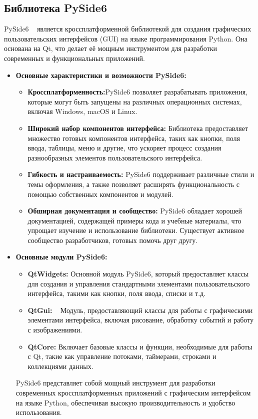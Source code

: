 \subsection{\label{subsec:ch01/sec02/sub02}Библиотека PySide6}
PySide6 ~\cite{book5author} является кроссплатформенной библиотекой для создания графических пользовательских интерфейсов (GUI) на языке программирования Python. Она основана на Qt, что делает её мощным инструментом для разработки современных и функциональных приложений.
\begin{itemize}
\item \textbf{Основные характеристики и возможности PySide6:} ~\cite{wikiRUHabr}

\begin{itemize}
     \item  \textbf{Кроссплатформенность:}PySide6 позволяет разрабатывать приложения, которые могут быть запущены на различных операционных системах, включая Windows, macOS и Linux. 

     \item  \textbf{Широкий набор компонентов интерфейса:} Библиотека предоставляет множество готовых компонентов интерфейса, таких как кнопки, поля ввода, таблицы, меню и другие, что ускоряет процесс создания разнообразных элементов пользовательского интерфейса.

     \item  \textbf{Гибкость и настраиваемость:} PySide6 поддерживает различные стили и темы оформления, а также позволяет расширять функциональность с помощью собственных компонентов и модулей.

     \item  \textbf{Обширная документация и сообщество:} PySide6 обладает хорошей документацией, содержащей примеры кода и учебные материалы, что упрощает изучение и использование библиотеки. Существует активное сообщество разработчиков, готовых помочь друг другу.
\end{itemize}

\item \textbf {Основные модули PySide6:} ~\cite{wikiRUQtDocumentation}
\begin{itemize}
    \item \textbf{QtWidgets:} Основной модуль PySide6, который предоставляет классы для создания и управления стандартными элементами пользовательского интерфейса, такими как кнопки, поля ввода, списки и т.д.

    \item \textbf{QtGui:} ~\cite{wikiRUHabr4} Модуль, предоставляющий классы для работы с графическими элементами интерфейса, включая рисование, обработку событий и работу с изображениями.

    \item \textbf{QtCore:} Включает базовые классы и функции, необходимые для работы с Qt, такие как управление потоками, таймерами, строками и коллекциями данных.
\end{itemize}
PySide6 представляет собой мощный инструмент для разработки современных кроссплатформенных приложений с графическим интерфейсом на языке Python, обеспечивая высокую производительность и удобство использования.
\end{itemize}



